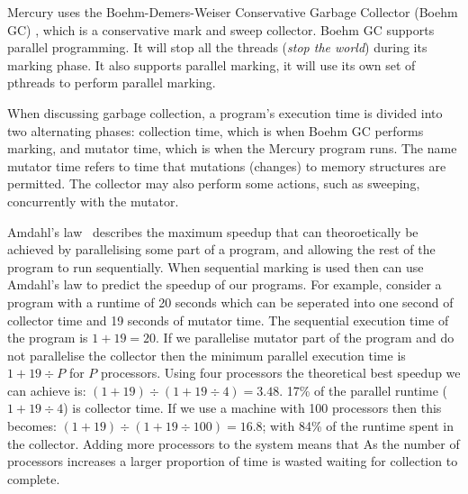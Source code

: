 Mercury uses the Boehm-Demers-Weiser Conservative Garbage Collector (Boehm GC)
\citep{boehm_gc},
which is a conservative mark and sweep collector.
Boehm GC supports parallel programming.
It will stop all the threads (\emph{stop the world}) during its marking
phase.
It also supports parallel marking,
it will use its own set of pthreads to perform parallel marking.

When discussing garbage collection,
a program's execution time is divided into two alternating phases:
collection time, which is when Boehm GC performs marking,
and mutator time, which is when the Mercury program runs.
The name mutator time refers to time that mutations (changes) to memory
structures are permitted.
The collector may also perform some actions,
such as sweeping,
concurrently with the mutator.

Amdahl's law~\citep{amdahl} describes the maximum speedup that
can theoroetically  be achieved by parallelising some part of a program,
and allowing the rest of the program to run sequentially.
When sequential marking is used then can use Amdahl's
law to predict the speedup of our programs.
For example, consider a program with a runtime of 20 seconds
which can be seperated into one second of collector time and 19 seconds
of mutator time.
The sequential execution time of the program is $1 + 19 = 20$.
If we parallelise mutator part of the program and do not parallelise the
collector then the minimum parallel execution time is $1 + 19{\div}P$
for $P$ processors.
Using four processors the theoretical best speedup we can achieve is:
$(1 + 19) \div (1 + 19\div4) = 3.48$.
17\% of the parallel runtime ($1 + 19\div4$) is collector time.
If we use a machine with 100 processors then this becomes:
$(1 + 19) \div (1 + 19\div100) = 16.8$;
with 84\% of the runtime spent in the collector.
Adding more processors to the system means that 
As the number of processors increases a larger proportion of time is
wasted waiting for collection to complete.

